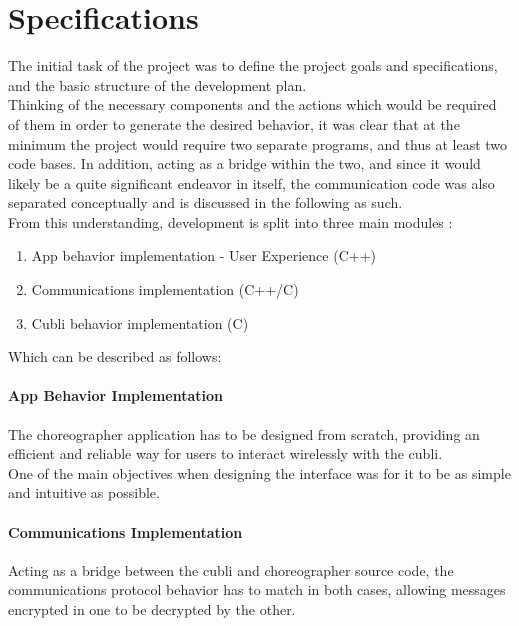 \chapter{Specifications}\label{sec:specifications}

The initial task of the project was to define the project goals and specifications, and the basic structure of the development plan.\\ 

Thinking of the necessary components and the actions which would be required of them in order to generate the desired behavior, it was clear that at the minimum the project would require two separate programs, and thus at least two code bases. In addition, acting as a bridge within the two, and since it would likely be a quite significant endeavor in itself, the communication code was also separated conceptually and is discussed in the following as such.\\ 

 From this understanding, development is split into three main modules :

\begin{enumerate}
\item App behavior implementation - User Experience (C++)  
\item Communications implementation  (C++/C)
\item Cubli behavior implementation  (C)  
\end{enumerate}
 
Which can be described as follows:

\subsubsection{App Behavior Implementation}

The choreographer application has to be designed from scratch, providing an efficient and reliable way for users to interact wirelessly with the cubli. \\

One of the main objectives when designing the interface was for it to be as simple and intuitive as possible.
 
\subsubsection{Communications Implementation}

Acting as a bridge between the cubli and choreographer source code, the communications protocol behavior has to match in both cases, allowing messages encrypted in one to be decrypted by the other.

